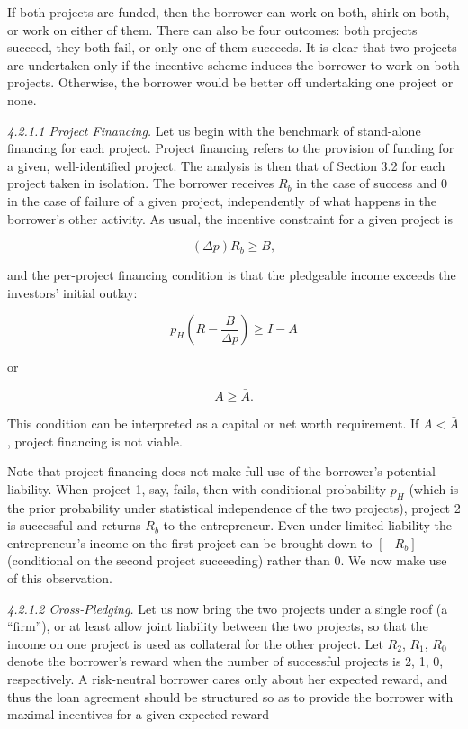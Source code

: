 \documentclass[11pt,a4paper]{article}
\begin{document}
If both projects are funded, then the borrower can work on both, shirk on both, or work on either of
them. There can also be four outcomes: both projects succeed, they both fail, or only one of them
succeeds. It is clear that two projects are undertaken only if the incentive scheme induces the
borrower to work on both projects. Otherwise, the borrower would be better off undertaking one
project or none.

\emph{4.2.1.1 Project Financing.} Let us begin with the benchmark of stand-alone financing for each
project. Project financing refers to the provision of funding for a given, well-identified project.
The analysis is then that of Section 3.2 for each project taken in isolation. The borrower receives
\(R_b\) in the case of success and 0 in the case of failure of a given project, independently of
what happens in the borrower's other activity. As usual, the incentive constraint for a given
project is

\[(\Delta p) R_b \geqslant B,\]

and the per-project financing condition is that the pledgeable income exceeds the investors' initial
outlay:

\[p_H\left(R - \frac{B}{\Delta p}\right) \geqslant I - A\]

or

\[A \geqslant \bar A.\]

This condition can be interpreted as a capital or net worth requirement. If \(A < \bar A\), project
financing is not viable.

Note that project financing does not make full use of the borrower's potential liability. When
project 1, say, fails, then with conditional probability \(p_H\) (which is the prior probability
under statistical independence of the two projects), project 2 is successful and returns \(R_b\) to
the entrepreneur. Even under limited liability the entrepreneur's income on the first project can be
brought down to \([-R_b]\) (conditional on the second project succeeding) rather than 0. We now make
use of this observation.

\emph{4.2.1.2 Cross-Pledging.} Let us now bring the two projects under a single roof (a ``firm''),
or at least allow joint liability between the two projects, so that the income on one project is
used as collateral for the other project. Let \(R_2\), \(R_1\), \(R_0\) denote the borrower's reward
when the number of successful projects is 2, 1, 0, respectively. A risk-neutral borrower cares only
about her expected reward, and thus the loan agreement should be structured so as to provide the
borrower with maximal incentives for a given expected reward
\end{document}
